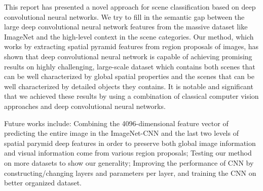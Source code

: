
This report has presented a novel approach for scene classification based on
deep convolutional neural networks. We try to fill in the semantic gap between
the large deep convolutional neural network features from the massive dataset
like ImageNet and the high-level context in the scene categories. Our method, which
works by extracting spatial pyramid features from region proposals of images, has shown
that deep convolutional neural network is capable of achieving promising
results on highly challenging, large-scale dataset which contains both scenes
that can be well characterized by global spatial properties and the scenes that
can be well characterized by detailed objects they contains.
It is notable and significant that we achieved these results by using a
combination of classical computer vision approaches and deep convolutional
neural networks.

Future works include: Combining the 4096-dimensional feature vector of predicting
the entire image in the ImageNet-CNN and the last two levels of spatial parymid
deep features in order to preserve both global image information and visual information
come from various region proposals; Testing our method on more datasets to show our
generality; Improving the performance of CNN by constructing/changing layers and parameters
per layer, and training the CNN on better organized dataset.